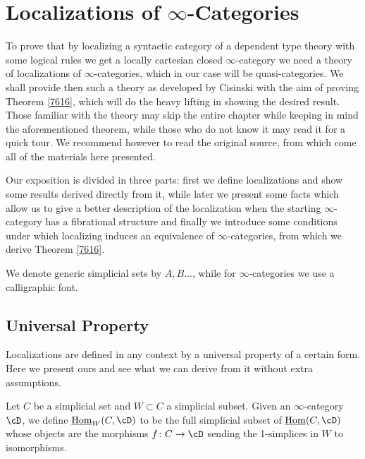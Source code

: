 \chapter{Localizations of \texorpdfstring{$\infty$}{∞}-Categories}

To prove that by localizing a syntactic category of a dependent type theory with
some logical rules we get a locally
cartesian closed $\infty$-category we need a theory of localizations
of $\infty$-categories, which in our case will be quasi-categories. We shall
provide then such a theory as
developed by Cisinski \cite{Cis19} with the aim of
proving Theorem \ref{7616}, which will do the heavy lifting in showing
the desired result. Those familiar with the theory may skip the entire chapter
while keeping in mind the aforementioned theorem, while those who do not know it
may read it for a quick tour. We recommend however to read the original source,
from which come all of the materials here presented.

\noindent
Our exposition is divided in three parts: first we define localizations and show
some results derived directly from it, while later we present some facts which
allow us to give a better description of the localization when the starting
$\infty$-category has a fibrational structure and finally we introduce some
conditions under which localizing induces an equivalence of $\infty$-categories,
from which we derive Theorem \ref{7616}.

\begin{notation}
  We denote generic simplicial sets by $A,B\ldots$, while for
  $\infty$-categories we use a calligraphic font.
\end{notation}

\section{Universal Property}

Localizations are defined in any context by a universal property of a certain
form. Here we present ours and see what we can derive from it without extra
assumptions.

\begin{defn}
  Let $C$ be a simplicial set and $W\subset C$ a simplicial subset. Given an
  $\infty$-category $\cD$, we define $\home_W(C,\cD)$ to be the full simplicial
  subset of $\home(C,\cD)$ whose objects are the morphisms $f\colon
  C\rightarrow\cD$ sending the 1-simplices in $W$ to isomorphisms.
\end{defn}

